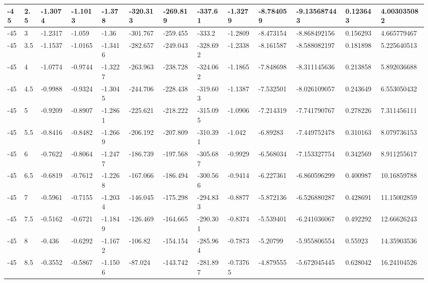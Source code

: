 \begin{longtable}{|l|l|l|l|l|l|l|l|l|l|l|l|l|}
-45   & 2.5   & -1.3074 & -1.1013 & -1.378  & -320.313 & -269.819 & -337.61  & -1.3279  & -8.784059   & -9.135687443   & 0.123643                 & 4.003035082 \\ \hline
-45   & 3     & -1.2317 & -1.059  & -1.36   & -301.767 & -259.455 & -333.2   & -1.2809  & -8.473154   & -8.868492156   & 0.156293                 & 4.665779467 \\ \hline
-45   & 3.5   & -1.1537 & -1.0165 & -1.3416 & -282.657 & -249.043 & -328.692 & -1.2338  & -8.161587   & -8.588082197   & 0.181898                 & 5.225640513 \\ \hline
-45   & 4     & -1.0774 & -0.9744 & -1.3227 & -263.963 & -238.728 & -324.062 & -1.1865  & -7.848698   & -8.311145636   & 0.213858                 & 5.892036688 \\ \hline
-45   & 4.5   & -0.9988 & -0.9324 & -1.3045 & -244.706 & -228.438 & -319.603 & -1.1387  & -7.532501   & -8.026109057   & 0.243649                 & 6.553050432 \\ \hline
-45   & 5     & -0.9209 & -0.8907 & -1.2861 & -225.621 & -218.222 & -315.095 & -1.0906  & -7.214319   & -7.741790767   & 0.278226                 & 7.311456111 \\ \hline
-45   & 5.5   & -0.8416 & -0.8482 & -1.2669 & -206.192 & -207.809 & -310.391 & -1.042   & -6.89283    & -7.449752478   & 0.310163                 & 8.079736153 \\ \hline
-45   & 6     & -0.7622 & -0.8064 & -1.2477 & -186.739 & -197.568 & -305.687 & -0.9929  & -6.568034   & -7.153327754   & 0.342569                 & 8.911255617 \\ \hline
-45   & 6.5   & -0.6819 & -0.7612 & -1.2268 & -167.066 & -186.494 & -300.566 & -0.9414  & -6.227361   & -6.860596299   & 0.400987                 & 10.16859788 \\ \hline
-45   & 7     & -0.5961 & -0.7155 & -1.2034 & -146.045 & -175.298 & -294.833 & -0.8877  & -5.872136   & -6.526880287   & 0.428691                 & 11.15002859 \\ \hline
-45   & 7.5   & -0.5162 & -0.6721 & -1.1849 & -126.469 & -164.665 & -290.301 & -0.8374  & -5.539401   & -6.241036067   & 0.492292                 & 12.66626243 \\ \hline
-45   & 8     & -0.436  & -0.6292 & -1.1672 & -106.82  & -154.154 & -285.964 & -0.7873  & -5.20799    & -5.955806554   & 0.55923                  & 14.35903536 \\ \hline
-45   & 8.5   & -0.3552 & -0.5867 & -1.1506 & -87.024  & -143.742 & -281.897 & -0.73765 & -4.879555   & -5.672045445   & 0.628042                 & 16.24104526 \\ \hline

\end{longtable}
